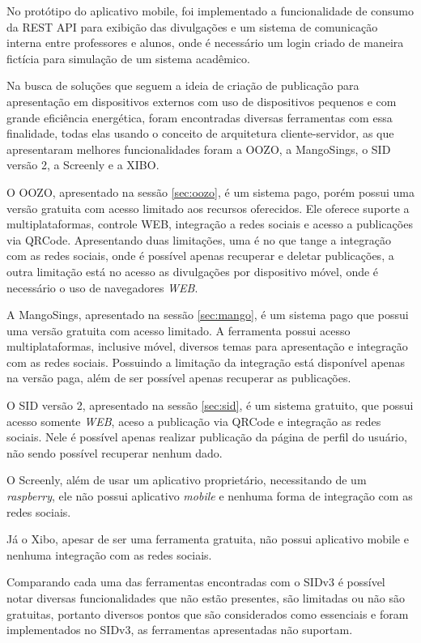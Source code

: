 No protótipo do aplicativo mobile, foi implementado a funcionalidade de consumo da REST API para exibição das divulgações e um sistema de comunicação interna entre professores e alunos, onde é necessário um login criado de maneira fictícia para simulação de um sistema acadêmico.

Na busca de soluções que seguem a ideia de criação de publicação para apresentação em dispositivos externos com uso de dispositivos pequenos e com grande eficiência energética, foram encontradas diversas ferramentas com essa finalidade, todas elas usando o conceito de arquitetura cliente-servidor, as que apresentaram melhores funcionalidades foram a OOZO, a MangoSings, o SID versão 2, a Screenly e a XIBO.

O OOZO, apresentado na sessão \ref{sec:oozo}, é um sistema pago, porém possui uma versão gratuita com acesso limitado aos recursos oferecidos. Ele oferece suporte a multiplataformas, controle WEB, integração a redes sociais e acesso a publicações via QRCode. Apresentando duas limitações, uma é no que tange a integração com as redes sociais, onde é possível apenas recuperar e deletar publicações, a outra limitação está no acesso as divulgações por dispositivo móvel, onde é necessário o uso de navegadores \textit{WEB}. 

A MangoSings, apresentado na sessão \ref{sec:mango}, é um sistema pago que possui uma versão gratuita com acesso limitado. A ferramenta possui acesso multiplataformas, inclusive móvel, diversos temas para apresentação e integração com as redes sociais. Possuindo a limitação da integração está disponível apenas na versão paga, além de ser possível apenas recuperar as publicações.

O SID versão 2, apresentado na sessão \ref{sec:sid}, é um sistema gratuito, que possui acesso somente \textit{WEB}, aceso a publicação via QRCode e integração as redes sociais. Nele é possível apenas realizar publicação da página de perfil do usuário, não sendo possível recuperar nenhum dado.

O Screenly, além de usar um aplicativo proprietário, necessitando de um \textit{raspberry}, ele não possui aplicativo \textit{mobile} e nenhuma forma de integração com as redes sociais.

Já o Xibo, apesar de ser uma ferramenta gratuita, não possui aplicativo mobile e nenhuma integração com as redes sociais. 

Comparando cada uma das ferramentas encontradas com o SIDv3 é possível notar diversas funcionalidades que não estão presentes, são limitadas ou não são gratuitas, portanto diversos pontos que são considerados como essenciais e foram implementados no SIDv3, as ferramentas apresentadas não suportam.

